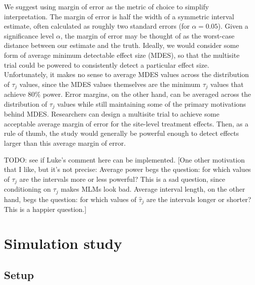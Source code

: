 \documentclass[]{article}
\begin{document}
We suggest using margin of error as the metric of choice to simplify interpretation.
The margin of error is half the width of a symmetric interval estimate, often calculated as roughly two standard errors (for $\alpha=0.05$).
Given a significance level $\alpha$, the margin of error may be thought of as the worst-case distance between our estimate and the truth.
Ideally, we would consider some form of average minimum detectable effect size (MDES), so that the multisite trial could be powered to consistently detect a particular effect size.
Unfortunately, it makes no sense to average MDES values across the distribution of $\tau_j$ values, since the MDES values themselves are the minimum $\tau_j$ values that achieve 80\% power.
Error margins, on the other hand, can be averaged across the distribution of $\tau_j$ values while still maintaining some of the primary motivations behind MDES.
Researchers can design a multisite trial to achieve some acceptable average margin of error for the site-level treatment effects.
Then, as a rule of thumb, the study would generally be powerful enough to detect effects larger than this average margin of error.


TODO: see if Luke's comment here can be implemented.
[One other motivation that I like, but it's not precise:
Average power begs the question: for which values of $\tau_j$ are the intervals more or less powerful?
This is a sad question, since conditioning on $\tau_j$ makes MLMs look bad.
Average interval length, on the other hand, begs the question: for which values of $\hat{\tau}_j$ are the intervals longer or shorter?
This is a happier question.]


\section{Simulation study}

\subsection{Setup}
\end{document}
